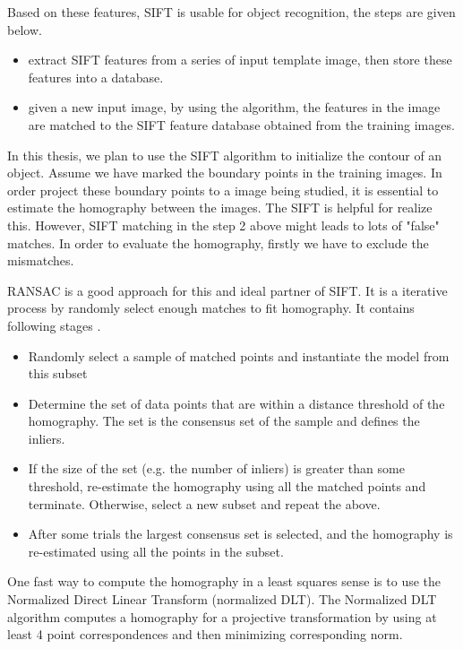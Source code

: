 Based on these features, SIFT is usable for object recognition, the
steps are given below.
\begin{itemize}
\item extract SIFT features from a series of input template image,
  then store these features into a database.
\item given a new input image, by using the algorithm, the features in
  the image are matched to the SIFT feature database obtained from the
  training images.
\end{itemize}

In this thesis, we plan to use the SIFT algorithm to initialize the
contour of an object. Assume we have marked the boundary points in the
training images. In order project these boundary points to a image
being studied, it is essential to estimate the homography between the
images. The SIFT is helpful for realize this. However, SIFT matching
in the step 2 above might leads to lots of "false" matches. In order
to evaluate the homography, firstly we have to exclude the
mismatches. 

RANSAC is a good approach for this and ideal partner of SIFT. It is a
iterative process by randomly select enough matches to fit
homography. It contains following stages \cite{fischler1981random}.
\begin{itemize}
\item  Randomly select a sample of matched points and instantiate the
  model from this subset
\item Determine the set of data points that are within a distance
  threshold of the homography. The set is the consensus set of the sample
  and defines the inliers.
\item If the size of the set (e.g. the number of inliers) is greater
  than some threshold, re-estimate the homography using all the matched
  points and terminate. Otherwise, select a new subset and repeat the
  above.
\item After some trials the largest consensus set is selected, and the
  homography is re-estimated using all the points in the subset.
\end{itemize}

One fast way to compute the homography in a least squares sense is to use the Normalized
Direct Linear Transform (normalized
DLT)\cite{hartley2003multiple}. The Normalized DLT algorithm computes
a homography for a projective transformation by using at least 4 point
correspondences and then minimizing corresponding norm.

